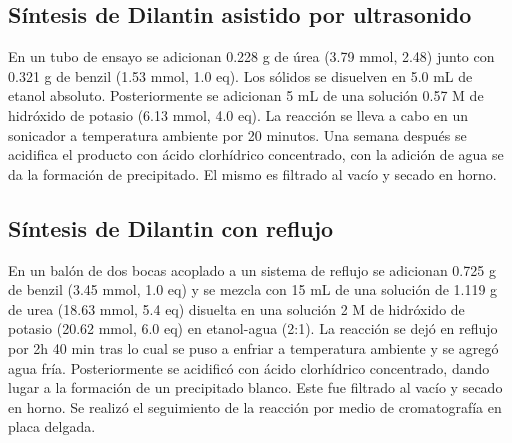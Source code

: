 \documentclass[fleqn,10pt]{SelfArx}
\begin{document}
\subsection{S\'intesis de Dilantin asistido por ultrasonido}
En un tubo de ensayo se adicionan 0.228 g de \'urea (3.79 mmol, 2.48) junto con 0.321 g de benzil (1.53 mmol, 1.0 eq). Los s\'olidos se disuelven en 5.0 mL de etanol absoluto. Posteriormente se adicionan 5 mL de una soluci\'on 0.57 M de hidr\'oxido de potasio (6.13 mmol, 4.0 eq). La reacci\'on se lleva a cabo en un sonicador a temperatura ambiente por 20 minutos. Una semana despu\'es se acidifica el producto con \'acido clorh\'idrico concentrado, con la adici\'on de agua se da la formaci\'on de precipitado. El mismo es filtrado al vac\'io y secado en horno. 

\subsection{S\'intesis de Dilantin con reflujo}
En un balón de dos bocas acoplado a un sistema de reflujo se adicionan 0.725 g de benzil (3.45 mmol, 1.0 eq) y se mezcla con 15 mL de una solución de 1.119 g de urea (18.63 mmol, 5.4 eq) disuelta en una solución 2 M de hidróxido de potasio (20.62 mmol, 6.0 eq) en etanol-agua (2:1). La reacción se dejó en reflujo por 2h 40 min tras lo cual se puso a enfriar a temperatura ambiente y se agregó agua fría. Posteriormente se acidificó con ácido clorhídrico concentrado, dando lugar a la formación de un precipitado blanco. Este fue filtrado al vacío y secado en horno. Se realizó el seguimiento de la reacción por medio de cromatografía en placa delgada.



\newpage
\onecolumn
\end{document}
